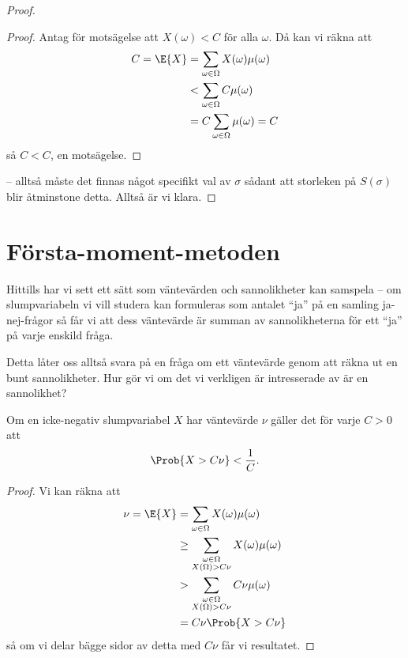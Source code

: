 \documentclass[nobib]{tufte-handout}
\begin{document}
\begin{theorem}
\begin{proof}
{\begin{lemma}
                \begin{proof}
                    Antag för motsägelse att $X(\omega) < C$ för alla $\omega$. Då kan vi räkna att
                    \begin{align*}
                        C = \E{X} &= \sum_{\omega \in \Omega} X(\omega)\mu(\omega)\\
                        &< \sum_{\omega \in \Omega} C\mu(\omega)\\
                        &= C\sum_{\omega \in \Omega} \mu(\omega) = C
                    \end{align*}
                    så $C < C$, en motsägelse.
                \end{proof}
            \end{lemma}
        } -- alltså måste det finnas något specifikt val av $\sigma$ sådant att storleken på $S(\sigma)$ blir åtminstone detta. Alltså är vi klara.
    \end{proof}
\end{theorem}

\section{Första-moment-metoden}

Hittills har vi sett ett sätt som väntevärden och sannolikheter kan samspela -- om slumpvariabeln vi vill studera kan formuleras som antalet ``ja'' på en samling ja-nej-frågor så får vi att dess väntevärde är summan av sannolikheterna för ett ``ja'' på varje enskild fråga.

Detta låter oss alltså svara på en fråga om ett väntevärde genom att räkna ut en bunt sannolikheter. Hur gör vi om det vi verkligen är intresserade av är en sannolikhet?

\begin{lemma}
    Om en icke-negativ slumpvariabel $X$ har väntevärde $\nu$ gäller det för varje $C > 0$ att
    $$\Prob{X > C\nu} < \frac{1}{C}.$$

    \begin{proof}
        Vi kan räkna att
        \begin{align*}
            \nu = \E{X} &= \sum_{\omega \in \Omega} X(\omega)\mu(\omega)\\
            &\geq \sum_{\substack{\omega \in \Omega\\X(\Omega) > C\nu}} X(\omega)\mu(\omega)\\
            &> \sum_{\substack{\omega \in \Omega\\X(\Omega) > C\nu}} C\nu\mu(\omega)\\
            &= C\nu \Prob{X > C\nu}
        \end{align*}
        så om vi delar bägge sidor av detta med $C\nu$ får vi resultatet.
    \end{proof}
\end{lemma}
\end{document}
